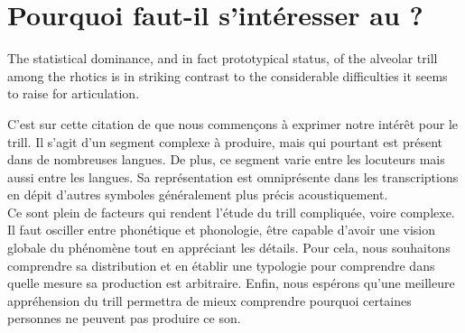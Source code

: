 %

\section{Pourquoi faut-il s'intéresser au  ?}

\begin{displayquote}
	The statistical dominance, and in fact prototypical status, of the alveolar trill among the rhotics is in striking contrast to the considerable difficulties it seems to raise for articulation. \parencite[4]{wieseRepresentationRhoticsRepresentation2011}
\end{displayquote}

C'est sur cette citation de \citeauthor{wieseRepresentationRhoticsRepresentation2011} que nous commençons à exprimer notre intérêt pour le trill. Il s'agit d'un segment complexe à produire, mais qui pourtant est présent dans de nombreuses langues. De plus, ce segment varie entre les locuteurs mais aussi entre les langues. Sa représentation est omniprésente dans les transcriptions en dépit d'autres symboles généralement plus précis acoustiquement.\\

Ce sont plein de facteurs qui rendent l'étude du trill compliquée, voire complexe. Il faut osciller entre phonétique et phonologie, être capable d'avoir une vision globale du phénomène tout en appréciant les détails.
Pour cela, nous souhaitons comprendre sa distribution et en établir une typologie pour comprendre dans quelle mesure sa production est arbitraire. Enfin, nous espérons qu'une meilleure appréhension du trill permettra de mieux comprendre pourquoi certaines personnes ne peuvent pas produire ce son.

